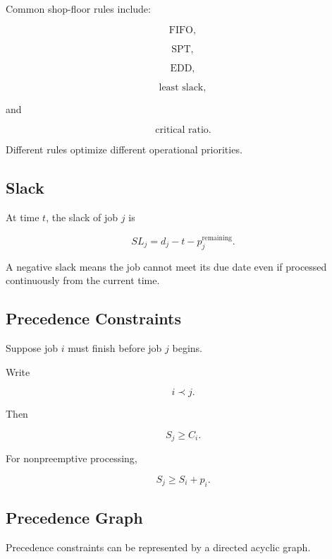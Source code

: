Common shop-floor rules include:

\[
\boxed{
\text{FIFO},
}
\]

\[
\boxed{
\text{SPT},
}
\]

\[
\boxed{
\text{EDD},
}
\]

\[
\boxed{
\text{least slack},
}
\]

and

\[
\boxed{
\text{critical ratio}.
}
\]

Different rules optimize different operational priorities.

\subsection{Slack}
\label{subsec:scheduling-slack}

At time \(t\), the slack of job \(j\) is

\[
\boxed{
SL_j
=
d_j
-
t
-
p_j^{\mathrm{remaining}}.
}
\]

A negative slack means the job cannot meet its due date even if processed
continuously from the current time.

\subsection{Precedence Constraints}
\label{subsec:scheduling-precedence}

Suppose job \(i\) must finish before job \(j\) begins.

Write

\[
\boxed{
i\prec j.
}
\]

Then

\[
\boxed{
S_j
\geq
C_i.
}
\]

For nonpreemptive processing,

\[
\boxed{
S_j
\geq
S_i+p_i.
}
\]

\subsection{Precedence Graph}
\label{subsec:precedence-graph}

Precedence constraints can be represented by a directed acyclic graph.

